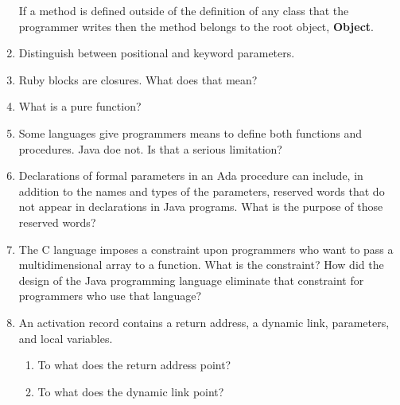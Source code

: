 \begin{enumerate}
  \begin{answer}
   If a method is defined outside of the definition of any class that the programmer writes then the method belongs to the root object, \textbf{Object}.
  \end{answer}

  \item Distinguish between positional and keyword parameters.

  \begin{answer}
   
  \end{answer}

  \item Ruby blocks are closures. What does that mean?

  \begin{answer}
   
  \end{answer}

  \item What is a pure function?

  \begin{answer}
   
  \end{answer}

  \item Some languages give programmers means to define
    both functions and procedures. Java doe not. Is that
    a serious limitation?

  \begin{answer}
   
  \end{answer}

  \item Declarations of formal parameters in an Ada procedure
    can include, in addition to the names and types of the
    parameters, reserved words that do not appear in declarations
    in Java programs. 
    What is the purpose of those reserved words?
 
  \item The C language imposes a constraint upon programmers
    who want to pass a multidimensional array to a function.
    What is the constraint? How did the design of the Java
    programming language eliminate that constraint for 
    programmers who use that language?

  \item An activation record contains a return
    address, a dynamic link, parameters, and
    local variables.
  \begin{enumerate}
    \item To what does the return address point?
    \item To what does the dynamic link point?
    \end{enumerate}


\end{enumerate}
